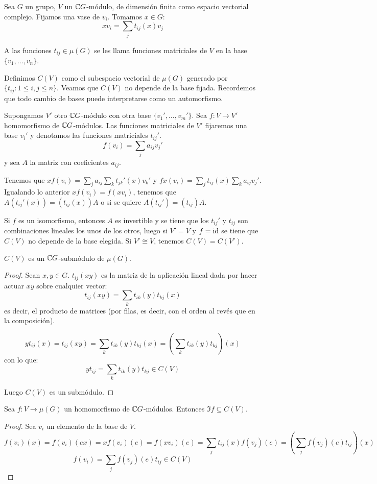 
Sea \(G\) un grupo, \(V\) un \(\mathbb{C} G\)-módulo, de dimensión finita
como espacio vectorial complejo. Fijamos una vase de \(v_i\).
Tomamos \(x\in G\):
\[
  xv_i=\sum_j t_{ij}(x)v_j
\]

A las funciones \(t_{ij}\in\mu(G)\) se les llama funciones
matriciales de \(V\) en la base \(\{v_1,\ldots,v_n\}\).

Definimos \(C(V)\) como el subespacio vectorial de \(\mu(G)\) generado por
\(\{t_{ij}:1\le i,j\le n\}\).
Veamos que \(C(V)\) no depende de la base fijada. Recordemos que todo
cambio de bases puede interpretarse como un automorfismo.

Supongamos \(V'\) otro \(\mathbb{C} G\)-módulo con otra base \(\{v_1',\ldots,v_m'\}\).
Sea \(f:V\longrightarrow V'\) homomorfismo de \(\mathbb{C} G\)-módulos. Las funciones
matriciales de \(V'\) fijaremos una base \(v_i'\) y denotamos las funciones
matriciales \(t_{ij}'\).
\[
  f(v_i)=\sum_j a_{ij}v_j'
\]
y sea \(A\) la matriz con coeficientes \(a_{ij}\).

Tenemos que \(xf(v_i)=\sum_j a_{ij}\sum_k t_{jk}'(x) v_k'\)
y \(fx(v_i)=\sum_j t_{ij}(x)\sum_k a_{ij}v_j'\). Igualando lo anterior
\(xf(v_i)=f(xv_i)\), tenemos que \(A(t_{ij}'(x))=(t_{ij}(x))A\) o
si se quiere \(A(t_{ij}')=(t_{ij})A\).

Si \(f\) es un isomorfismo, entonces \(A\) es invertible y
se tiene que los \(t_{ij}'\) y \(t_{ij}\) son combinaciones lineales los
unos de los otros, luego si \(V'=V\) y \(f=\operatorname{id}\) se tiene que \(C(V)\) no
depende de la base elegida. Si \(V'\cong V\), tenemos \(C(V)=C(V')\).

\begin{lema}
  \(C(V)\) es un \(\mathbb{C} G\)-submódulo de \(\mu(G)\).
\end{lema}
\begin{proof}
  Sean \(x,y\in G\).
  \(
    t_{ij}(xy)
  \)
  es la matriz de la aplicación lineal dada por hacer actuar
  \(xy\) sobre cualquier vector:
  \[
    t_{ij}(xy)=\sum_k t_{ik}(y)t_{kj}(x)
  \]
  es decir, el producto de matrices (por filas, es decir, con el orden
  al revés que en la composición).

  \[
    yt_{ij}(x)=t_{ij}(xy)=\sum_k t_{ik}(y)t_{kj}(x)=
    (\sum_k t_{ik}(y)t_{kj})(x)
  \]
  con lo que:
  \[
    yt_{ij}=\sum_k t_{ik}(y)t_{kj}\in C(V)
  \]

  Luego \(C(V)\) es un submódulo.

\end{proof}

\begin{lema}
  Sea \(f:V\longrightarrow\mu(G)\) un homomorfismo de \(\mathbb{C} G\)-módulos.
  Entonces \(\Im f\subseteq C(V)\).
\end{lema}
\begin{proof}
  Sea \(v_i\) un elemento de la base de \(V\).
  \[
    f(v_i)(x)=f(v_i)(e x)=xf(v_i)(e)=f(xv_i)(e)=\sum_j t_{ij}(x) f(v_j)(e)
    =\left(\sum_j f(v_j)(e)t_{ij}\right)(x)
  \]
  \[
    f(v_i)=\sum_j f(v_j)(e)t_{ij}\in C(V)
  \]

\end{proof}


